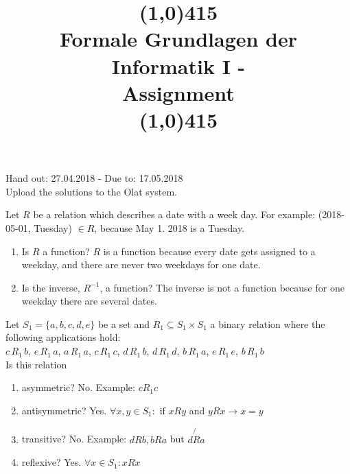 \documentclass{exercise}
\title{ \line(1,0){415} \\ Formale Grundlagen der Informatik I -\\ Assignment \theexercise\\
\line(1,0){415}}
\begin{document}
\maketitle

\begin{center}
	Hand out: 27.04.2018 - Due to: 17.05.2018\\\vspace{1em}
  Upload the solutions to the Olat system.
\end{center}



\subtask Let $R$ be a relation which describes a date with a week day. For example: (2018-05-01, Tuesday) $\in R$, because May 1. 2018 is a Tuesday.

\begin{enumerate}
	\item Is $R$ a function?\newline
    $R$ is a function because every date gets assigned to a weekday, and there are never two weekdays for one date.
	\item Is the inverse, $R^{-1}$, a function?\newline
    The inverse is not a function because for one weekday there are several dates.
\end{enumerate}


\subtask Let $S_1 = \{ a, b, c, d, e \}$ be a set and $R_1 \subseteq S_1 \times S_1$ a binary relation where the following applications hold:\\

$c\, R_1\, b$, $e\, R_1\, a$, $a\, R_1\, a$, $c\, R_1\, c$, $d\, R_1\, b$, $d\, R_1\, d$, $b\, R_1\, a$, $e\, R_1\, e$, $b\, R_1\, b$\\

Is this relation
\begin{enumerate}
	\item asymmetric?
	No. Example: $cR_1c$
	\item antisymmetric?
	Yes. $\forall x,y \in S_1: $ if $ xRy$ and $yRx \rightarrow x=y$
	\item transitive? No. Example: $dRb, bRa$ but $d\not{R} a$
	\item reflexive? Yes. $\forall x \in S_1:xRx $
\end{enumerate}
\end{document}

